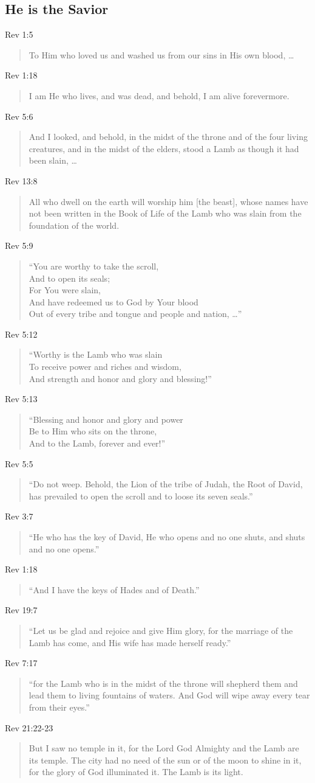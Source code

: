 \documentclass[12pt]{article}
\newcommand{\I}{\item}
\newcommand{\Q}[1]{\begin{quote} #1 \end{quote}}
\begin{document}
\subsection{He is the Savior}
\I Rev 1:5 \Q{To Him who loved us and washed us from our sins 
                in His own blood, \ldots}
\I Rev 1:18 \Q{I am He who lives, and was dead, and behold, 
                I am alive forevermore.}
\I Rev 5:6 \Q{And I looked, and behold, in the midst of the throne
                and of the four living creatures, and in the midst of the
                elders, stood a Lamb as though it had been slain, \ldots}
\I Rev 13:8 \Q{All who dwell on the earth will worship him [the beast], 
                whose names have not been written in the Book of Life
                of the Lamb who was slain from the foundation of the world.}
\I Rev 5:9 \Q{``You are worthy to take the scroll, \\
                And to open its seals; \\
                For You were slain, \\
                And have redeemed us to God by Your blood \\
                Out of every tribe and tongue and people and nation, \ldots''}
\I Rev 5:12 \Q{``Worthy is the Lamb who was slain \\
                To receive power and riches and wisdom, \\
                And strength and honor and glory and blessing!''}
\I Rev 5:13 \Q{``Blessing and honor and glory and power \\
                Be to Him who sits on the throne, \\
                And to the Lamb, forever and ever!''}
\I Rev 5:5 \Q{``Do not weep. Behold, the Lion of the tribe of Judah,
                the Root of David, has prevailed to open the scroll 
                and to loose its seven seals.''}
\I Rev 3:7 \Q{``He who has the key of David, He who opens and no one shuts, 
                and shuts and no one opens.''}
\I Rev 1:18 \Q{``And I have the keys of Hades and of Death.''}
\I Rev 19:7 \Q{``Let us be glad and rejoice and give Him glory,
                for the marriage of the Lamb has come,
                and His wife has made herself ready.''}
\I Rev 7:17 \Q{``for the Lamb who is in the midst of the throne 
                will shepherd them and lead them to living fountains of waters.
                And God will wipe away every tear from their eyes.''}
\I Rev 21:22-23 \Q{But I saw no temple in it, for the Lord God Almighty 
                and the Lamb are its temple. The city had no need 
                of the sun or of the moon to shine in it, 
                for the glory of God illuminated it. The Lamb is its light.}
\end{document}

